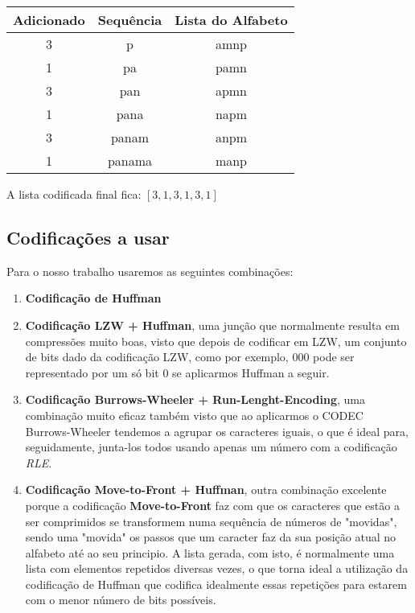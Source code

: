 \documentclass[11pt,journal,compsoc]{IEEEtran}
\begin{document}
    \begin{center}
    \begin{tabular}{ |c|c|c| } 
      \hline
      Adicionado & Sequência & Lista do Alfabeto\\
      \hline
      3 & p & amnp\\
      \hline
      1 & pa & pamn\\
      \hline
      3 & pan & apmn\\
      \hline
      1 & pana & napm\\
      \hline
      3 & panam & anpm\\
      \hline
      1 & panama & manp\\
      \hline
    \end{tabular}
    
    
    
    A lista codificada final fica:
    $[3,1,3,1,3,1]$
    \end{center}
    
    
    \subsection{Codificações a usar}
    Para o nosso trabalho usaremos as seguintes combinações:
    \begin{enumerate}
        \item \textbf{Codificação de Huffman}
        \item \textbf{Codificação LZW + Huffman}, uma junção que normalmente resulta em compressões muito boas, visto que depois de codificar em LZW, um conjunto de bits dado da codificação LZW, como por exemplo, 000 pode ser representado por um só bit 0 se aplicarmos Huffman a seguir.
        \item \textbf{Codificação Burrows-Wheeler + Run-Lenght-Encoding}, uma combinação muito eficaz também visto que ao aplicarmos o CODEC Burrows-Wheeler tendemos a agrupar os caracteres iguais, o que é ideal para, seguidamente, junta-los todos usando apenas um número com a codificação \textit{RLE}.
        
        \item \textbf{Codificação Move-to-Front + Huffman}, outra combinação excelente porque a codificação \textbf{Move-to-Front} faz com que os caracteres que estão a ser comprimidos se transformem numa sequência de números de "movidas", sendo uma "movida" os passos que um caracter faz da sua posição atual no alfabeto até ao seu principio. A lista gerada, com isto, é normalmente uma lista com elementos repetidos diversas vezes, o que torna ideal a utilização da codificação de Huffman que codifica idealmente essas repetições para estarem com o menor número de bits possíveis.
    \end{enumerate}
    
\end{document}
